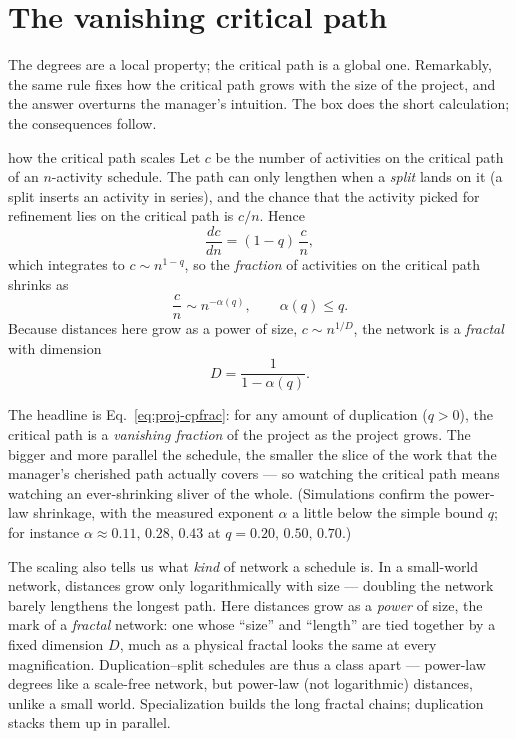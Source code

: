 \section{The vanishing critical path}

The degrees are a local property; the critical path is a global one. Remarkably,
the same rule fixes how the critical path grows with the size of the project, and
the answer overturns the manager's intuition. The box does the short
calculation; the consequences follow.

\begin{calculation}{how the critical path scales}
Let $c$ be the number of activities on the critical path of an $n$-activity
schedule. The path can only lengthen when a \emph{split} lands on it (a split
inserts an activity in series), and the chance that the activity picked for
refinement lies on the critical path is $c/n$. Hence
\begin{equation}
  \frac{dc}{dn} = (1-q)\,\frac{c}{n},
  \label{eq:proj-cp}
\end{equation}
which integrates to $c\sim n^{1-q}$, so the \emph{fraction} of activities on the
critical path shrinks as
\begin{equation}
  \frac{c}{n} \sim n^{-\alpha(q)}, \qquad \alpha(q) \le q.
  \label{eq:proj-cpfrac}
\end{equation}
Because distances here grow as a power of size, $c\sim n^{1/D}$, the network is a
\emph{fractal} with dimension
\begin{equation}
  D = \frac{1}{1-\alpha(q)}.
  \label{eq:proj-fractal}
\end{equation}
\end{calculation}

The headline is Eq.~\eqref{eq:proj-cpfrac}: for any amount of duplication
($q>0$), the critical path is a \emph{vanishing fraction} of the project as the
project grows. The bigger and more parallel the schedule, the smaller the slice
of the work that the manager's cherished path actually covers --- so watching the
critical path means watching an ever-shrinking sliver of the whole. (Simulations
confirm the power-law shrinkage, with the measured exponent $\alpha$ a little
below the simple bound $q$; for instance $\alpha\approx 0.11,\,0.28,\,0.43$ at
$q=0.20,\,0.50,\,0.70$.)

The scaling also tells us what \emph{kind} of network a schedule is. In a
small-world network, distances grow only logarithmically with size --- doubling
the network barely lengthens the longest path. Here distances grow as a
\emph{power} of size, the mark of a \emph{fractal} network: one whose ``size''
and ``length'' are tied together by a fixed dimension $D$, much as a physical
fractal looks the same at every magnification. Duplication--split schedules are
thus a class apart --- power-law degrees like a scale-free network, but power-law
(not logarithmic) distances, unlike a small world. Specialization builds the long
fractal chains; duplication stacks them up in parallel.

